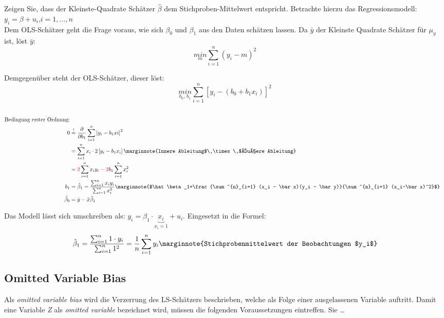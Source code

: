 Zeigen Sie, dass der Kleinste-Quadrate Schätzer $\hat\beta$ dem
Stichproben-Mittelwert entspricht. Betrachte hierzu das
Regressionsmodell: $y_i = \beta + u_i$,\enskip\enskip $i=1,\ldots,n$\\

Dem OLS-Schätzer geht die Frage voraus, wie sich $\beta_0$ und $\beta_1$ aus
den Daten schätzen lassen. Da $\bar y$ der Kleinste Quadrate Schätzer für
$\mu_y$ ist, löst $\bar y$: 
$$\underset{m}{min} \sum^{n}_{i=1}\left( y_i - m \right)^2$$

Demgegenüber steht der OLS-Schätzer, dieser löst:
$$\underset{b_0,\,b_1}{min} \sum^{n}_{i=1}\left[ y_i - (b_0 +b_1x_i)
\right]^2$$\\

\begin{align*}
	\text{Bedingung erster Ordnung:}\\
	0&\overset{!}{=}\frac{\partial}{\partial b_1} \sum^{n}_{i=1}
	\left[ y_i - b_1xi \right]^2\\
	&=\sum^{n}_{i=1} x_i\cdot2 \left[ y_i - b_1 x_i
\right]\marginnote{Innere Ableitung$\,\times\,$Äußere Ableitung}\\
&=\textcolor{red}{2} \sum^{n}_{i=1} x_iy_i -\textcolor{red}{2}b_1 \sum^{n}_{i=1} x_i^2\\
b_1&=\hat\beta_1=\dfrac{\sum^{n}_{i=1} x_iy_i}{\sum^{n}_{i=1} x_i^2}
\marginnote{$\hat\beta_1=\frac{\sum^{n}_{i=1} (x_i - \bar x)(y_i - \bar y)}{\sum^{n}_{i=1} (x_i-\bar x)^2}$}\\
\hat\beta_0 &= \bar y - \bar x \hat\beta_1
	\end{align*}

Das Modell lässt sich umschreiben als: $y_i=\beta_1 \cdot
\underbrace{x_i}_{x_i=1} + u_i.$
Eingesetzt in die Formel: $$\hat\beta_1= \dfrac{\sum^{n}_{i=1} 1\cdot y_i}{\sum^{n}_{i=1} 1^2}=\dfrac{1}{n} \sum^{n}_{i=1} y_i
\marginnote{Stichprobenmittelwert der Beobachtungen $y_i$}$$


\subsection{Omitted Variable Bias}
\label{sec:omitted_variable_bias}


Als \emph{omitted variable bias} wird die Verzerrung des LS-Schätzers beschrieben,
welche als Folge einer ausgelassenen Variable auftritt. Damit eine
Variable \emph{Z} als \emph{omitted variable} bezeichnet wird, müssen
die folgenden Voraussetzungen eintreffen. Sie \ldots

